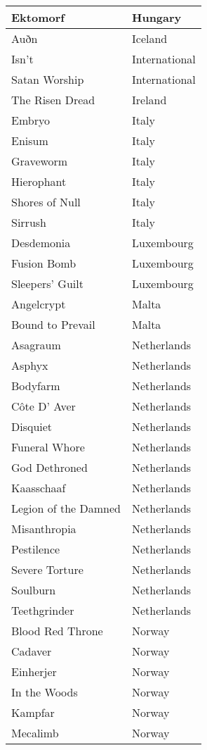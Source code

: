 \documentclass[12pt, a4paper, twoside]{report}
\begin{document}
\begin{center}
\begin{longtable}{|p{5cm}|p{5cm}|}
Ektomorf & Hungary \\ \hline
Auðn & Iceland \\ \hline
Isn't & International \\ \hline
Satan Worship & International \\ \hline
The Risen Dread & Ireland \\ \hline
Embryo & Italy \\ \hline
Enisum & Italy \\ \hline
Graveworm & Italy \\ \hline
Hierophant & Italy \\ \hline
Shores of Null & Italy \\ \hline
Sirrush & Italy \\ \hline
Desdemonia & Luxembourg \\ \hline
Fusion Bomb & Luxembourg \\ \hline
Sleepers' Guilt & Luxembourg \\ \hline
Angelcrypt & Malta \\ \hline
Bound to Prevail & Malta \\ \hline
Asagraum & Netherlands \\ \hline
Asphyx & Netherlands \\ \hline
Bodyfarm & Netherlands \\ \hline
Côte D' Aver & Netherlands \\ \hline
Disquiet & Netherlands \\ \hline
Funeral Whore & Netherlands \\ \hline
God Dethroned & Netherlands \\ \hline
Kaasschaaf & Netherlands \\ \hline
Legion of the Damned & Netherlands \\ \hline
Misanthropia & Netherlands \\ \hline
Pestilence & Netherlands \\ \hline
Severe Torture & Netherlands \\ \hline
Soulburn & Netherlands \\ \hline
Teethgrinder & Netherlands \\ \hline
Blood Red Throne & Norway \\ \hline
Cadaver & Norway \\ \hline
Einherjer & Norway \\ \hline
In the Woods & Norway \\ \hline
Kampfar & Norway \\ \hline
Mecalimb & Norway \\ \hline

\end{longtable}
\end{center}
\end{document}
